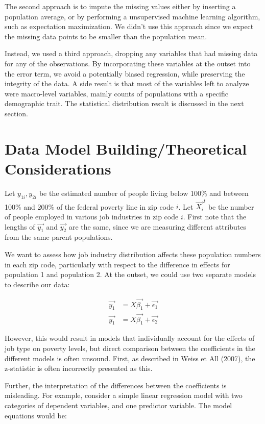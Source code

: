 The second approach is to impute the missing values either by inserting a population average, or by performing a unsupervised machine learning algorithm, such as expectation maximization. We didn't use this approach since we expect the missing data points to be smaller than the population mean. 

Instead, we used a third approach, dropping any variables that had missing data for any of the observations. By incorporating these variables at the outset into the error term, we avoid a potentially biased regression, while preserving the integrity of the data. A side result is that most of the variables left to analyze were macro-level variables, mainly counts of populations with a specific demographic trait. The statistical distribution result is discussed in the next section. 

\section{Data Model Building/Theoretical Considerations}

Let $y_{1i},y_{2i}$ be the estimated number of people living below 100\% and between 100\% and 200\% of the federal poverty line in zip code $i$. Let $\vec{X_i}^t$ be the number of people employed in various job industries in zip code $i$. First note that the lengths of $\vec{y_1}$ and $\vec{y_2}$ are the same, since we are measuring different attributes from the same parent populations.

We want to assess how job industry distribution affects these population numbers in each zip code, particularly with respect to the difference in effects for population 1 and population 2. At the outset, we could use two separate models to describe our data:

 \begin{align} \vec{y_1} &= X\vec{\beta_1} + \vec{\epsilon_1} \label{original_1} \\ \vec{y_1} &= X\vec{\beta_1} + \vec{\epsilon_2} \label{original_2}\end{align}

However, this would result in models that individually account for the effects of job type on poverty levels, but direct comparison between the coefficients in the different models is often unsound. First, as described in Weiss et All (2007), the z-statistic is often incorrectly presented as this.

Further, the interpretation of the differences between the coefficients is misleading. For example, consider a simple linear regression model with two categories of dependent variables, and one predictor variable. The model equations would be:

